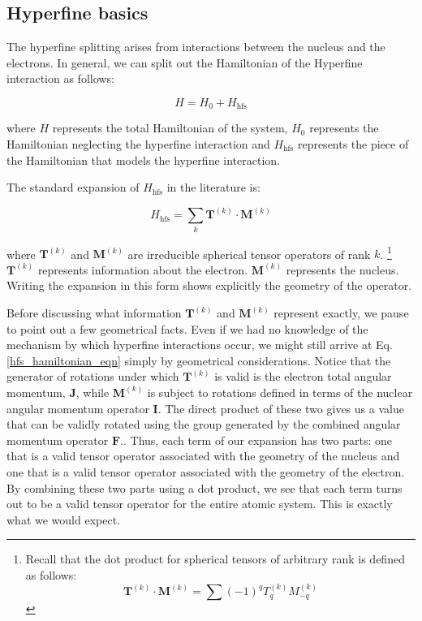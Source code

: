 \subsection{Hyperfine basics}

The hyperfine splitting arises from interactions between the nucleus and the electrons. In general, we can split out the Hamiltonian of the Hyperfine interaction as follows: 

\begin{equation}
H=H_0+H_{\mathrm{hfs}}
\end{equation}

where $H$ represents the total Hamiltonian of the system, $H_0$ represents the Hamiltonian neglecting the hyperfine interaction and $H_{\mathrm{hfs}}$ represents the piece of the Hamiltonian that models the hyperfine interaction. 

The standard expansion of $H_{\mathrm{hfs}}$ in the literature is:  

\begin{equation}
H_{\mathrm{hfs}}=\sum_k \mathbf{T}^{(k)} \cdot \mathbf{M}^{(k)} \label{hfs_hamiltonian_eqn}
\end{equation}
\cite{schwartz_hyperfine_expansion}
\cite{experimental_hyperfine_alkali_arimondo}
\cite{chinesePhysics}

where $\mathbf{T}^{(k)}$ and $\mathbf{M}^{(k)}$ are irreducible spherical tensor operators of rank $k$.
\footnote{Recall that the dot product for spherical tensors of arbitrary rank is defined as follows:
\begin{equation}\label{TkMk_hyperfine}
\mathbf{T}^{(k)}\cdot\mathbf{M}^{(k)}=\sum (-1)^qT_q^{(k)}M_{-q}^{(k)}
\end{equation}
}
 $\mathbf{T}^{(k)}$ represents information about the electron.
$\mathbf{M}^{(k)}$ represents the nucleus.\cite{experimental_hyperfine_alkali_arimondo}\cite{schwartz_hyperfine_expansion}
\cite{sobelman_spectra}
Writing the expansion in this form shows explicitly the geometry of the operator. 

Before discussing what information $\mathbf{T}^{(k)}$ and $\mathbf{M}^{(k)}$ represent exactly,
we pause to point out a few geometrical facts. Even if we had no knowledge of the mechanism by which hyperfine interactions occur, we might still arrive at Eq.\,\ref{hfs_hamiltonian_eqn} simply by geometrical considerations.
Notice that the generator of rotations under which $\mathbf{T}^{(k)}$ is valid is the electron total angular momentum, $\mathbf{J}$, while $\mathbf{M}^{(k)}$ is subject to rotations defined in terms of the nuclear angular momentum operator $\mathbf{I}$. 
The direct product of these two gives us a value that can be validly rotated using the group generated by the combined angular momentum operator $\mathbf{F}$.\cite{Racah2}\cite{sobelman_spectra}. Thus, each term of our expansion has two parts: one that is a valid tensor operator associated with the geometry of the nucleus and one that is a valid tensor operator associated with the geometry of the electron. By combining these two parts using a dot product, we see that each term turns out to be a valid tensor operator for the entire atomic system. This is exactly what we would expect.

